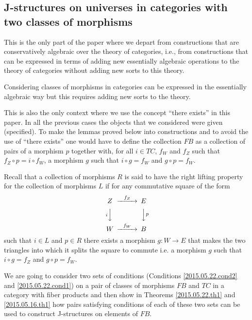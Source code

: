 \documentclass[12pt]{article}
\newcommand{\sr}{\rightarrow}
\begin{document}
\subsection{J-structures on universes in categories with two classes of morphisms}
%
%
This is the only part of the paper where we depart from constructions that are conservatively algebraic over the theory of categories, i.e., from constructions that can be expressed in terms of adding new essentially algebraic operations to the theory of categories without adding new sorts to this theory. 

Considering classes of morphisms in categories can be expressed in the essentially algebraic way but this requires adding new sorts to the theory. 

This is also the only context where we use the concept ``there exists'' in this paper. In all the previous cases the objects that we considered were given (specified). To make the lemmas proved below into constructions and to avoid the use of ``there exists'' one would have to define the collection $FB$ as a collection of pairs of a morphism $p$ together with, for all $i\in TC$, $f_W$ and $f_Z$ such that $f_Z\circ p=i\circ f_W$, a morphism $g$ such that $i\circ g=f_W$ and $g\circ p=f_W$. 

Recall that a collection of morphisms $R$ is said to have the right lifting property for the collection of morphisms $L$ if for any commutative square of the form
%
$$
\begin{CD}
Z @>f_Z>> E\\
@Vi VV @VVp V\\
W @>f_W>> B
\end{CD}
$$
%
such that $i\in L$ and $p\in R$ there exists a morphism $g:W\sr E$ that makes the two triangles into which it splits the square to commute i.e. a morphism $g$ such that $i\circ g=f_Z$ and $g\circ p=f_W$. 
%

We are going to consider two sets of conditions (Conditions \ref{2015.05.22.cond2} and \ref{2015.05.22.cond1}) on a pair of classes of morphisms $FB$ and $TC$ in a category with fiber products and then show in Theorems \ref{2015.05.22.th1} and \ref{2015.05.16.th1} how pairs satisfying conditions of each of these two sets can be used to construct J-structures on elements of $FB$. 
\end{document}
